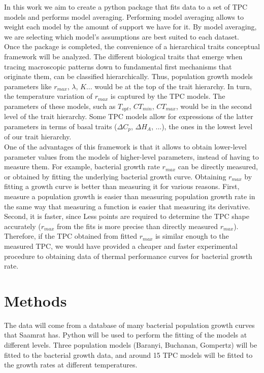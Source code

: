 \documentclass[titlepage,11pt]{article}
\begin{document}
\begin{linenumbers}
			In this work we aim to create a python package that fits data to a set of TPC models and performs model averaging. Performing model averaging allows to weight each model by the amount of support we have for it. By model averaging, we are selecting which model's assumptions are best suited to each dataset.\\
			Once the package is completed, the convenience of a hierarchical traits conceptual framework will be analyzed. The different biological traits that emerge when tracing macroscopic patterns down to fundamental first mechanisms that originate them, can be classified hierarchically. Thus, population growth models parameters like $ r_{max} $, $ \lambda $, $ K $... would be at the top of the trait hierarchy. In turn, the temperature variation of $ r_{max} $ is captured by the TPC models. The parameters of these models, such as $ T_{opt} $, $ CT_{min} $, $ CT_{max} $, would be in the second level of the trait hierarchy. Some TPC models allow for expressions of the latter parameters in terms of basal traits ($ \Delta C_p $, $ \Delta H_A $, ...), the ones in the lowest level of our trait hierarchy. \\
			One of the advantages of this framework is that it allows to obtain lower-level parameter values from the models of higher-level parameters, instead of having to measure them. For example, bacterial growth rate $ r_{max} $ can be directly measured, or obtained by fitting the underlying bacterial growth curve. Obtaining $ r_{max} $ by fitting a growth curve is better than measuring it for various reasons. First, measure a population growth is easier than measuring population growth rate in the same way that measuring a function is easier that measuring its derivative. Second, it is faster, since Less points are required to determine the TPC shape accurately ($ r_{max} $ from the fits is more precise than directly measured $ r_{max} $). Therefore, if the TPC obtained from fitted $ r_{max} $ is similar enough to the measured TPC, we would have provided a cheaper and faster experimental procedure to obtaining data of thermal performance curves for bacterial growth rate.
		\section{Methods}
			The data will come from a database of many bacterial population growth curves that Saamrat has. Python will be used to perform the fitting of the models at different levels. Three population models (Baranyi, Buchanan, Gompertz) will be fitted to the bacterial growth data, and around 15 TPC models will be fitted to the growth rates at different temperatures.

\end{linenumbers}
\end{document}

